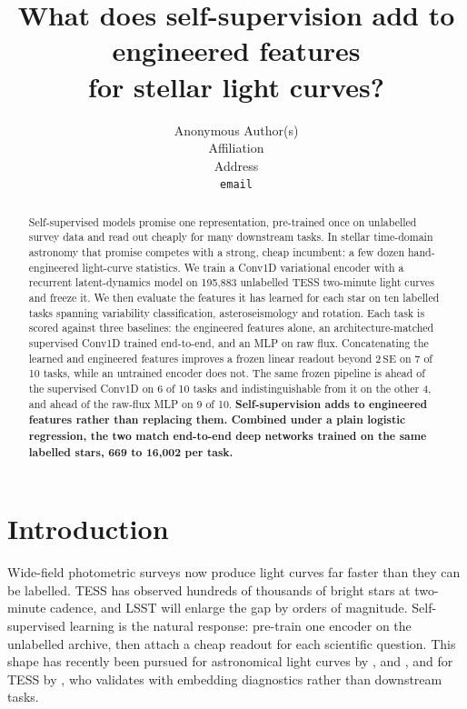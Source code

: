 \documentclass{article}
\title{What does self-supervision add to engineered features\\for stellar light curves?}
\author{Anonymous Author(s)\\Affiliation\\Address\\\texttt{email}}
\begin{document}
\maketitle

\begin{abstract}
Self-supervised models promise one representation, pre-trained once on unlabelled survey data and
read out cheaply for many downstream tasks. In stellar time-domain astronomy that promise competes
with a strong, cheap incumbent: a few dozen hand-engineered light-curve statistics. We train a
Conv1D variational encoder with a recurrent latent-dynamics model on 195{,}883 unlabelled TESS
two-minute light curves and freeze it. We then evaluate the features it has learned for each star on
ten labelled tasks spanning variability classification, asteroseismology and rotation. Each task is
scored against three baselines: the engineered features alone, an architecture-matched supervised
Conv1D trained end-to-end, and an MLP on raw flux. Concatenating the learned and engineered features
improves a frozen linear readout beyond $2\,\mathrm{SE}$ on 7 of 10 tasks, while an untrained encoder
does not. The
same frozen pipeline is ahead of the supervised Conv1D on 6 of 10 tasks and indistinguishable from it
on the other 4, and ahead of the raw-flux MLP on 9 of 10. \textbf{Self-supervision adds to engineered features rather than replacing them. Combined under a
plain logistic regression, the two match end-to-end deep networks trained on the same labelled stars,
669 to 16{,}002 per task.}
\end{abstract}

\section{Introduction}

Wide-field photometric surveys now produce light curves far faster than they can be labelled. TESS
\citep{ricker2015} has observed hundreds of thousands of bright stars at two-minute cadence, and
LSST \citep{ivezic2019} will enlarge the gap by orders of magnitude. Self-supervised learning is the
natural response: pre-train one encoder on the unlabelled archive, then attach a cheap readout for
each scientific question. This shape has recently been pursued for astronomical light curves by
\citet{donoso2025astromer2}, \citet{zuo2025falco} and \citet{rui2026jepa}, and for TESS by
\citet{poznanski2026}, who validates with embedding diagnostics rather than downstream tasks.
\end{document}
